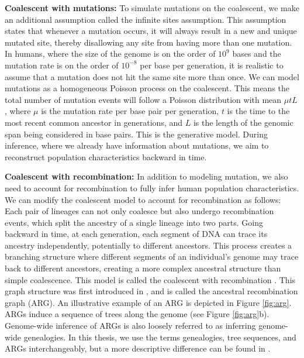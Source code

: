 \textbf{Coalescent with mutations:} To simulate mutations on the coalescent, we make an additional assumption called the infinite sites assumption. This assumption states that whenever a mutation occurs, it will always result in a new and unique mutated site, thereby disallowing any site from having more than one mutation. In humans, where the size of the genome is on the order of \(10^9\) bases and the mutation rate is on the order of \(10^{-8}\) per base per generation, it is realistic to assume that a mutation does not hit the same site more than once. We can model mutations as a homogeneous Poisson process on the coalescent. This means the total number of mutation events will follow a Poisson distribution with mean \(\mu t L\), where \(\mu\) is the mutation rate per base pair per generation, \(t\) is the time to the most recent common ancestor in generations, and \(L\) is the length of the genomic span being considered in base pairs. This is the generative model. During inference, where we already have information about mutations, we aim to reconstruct population characteristics backward in time.

\textbf{Coalescent with recombination:} In addition to modeling mutation, we also need to account for recombination to fully infer human population characteristics. We can modify the coalescent model to account for recombination as follows: Each pair of lineages can not only coalesce but also undergo recombination events, which split the ancestry of a single lineage into two parts. Going backward in time, at each generation, each segment of DNA can trace its ancestry independently, potentially to different ancestors. This process creates a branching structure where different segments of an individual's genome may trace back to different ancestors, creating a more complex ancestral structure than simple coalescence. This model is called the coalescent with recombination \cite{Hudson1983}. This graph structure was first introduced in \cite{Griffiths1997}, and is called the ancestral recombination graph (ARG). An illustrative example of an ARG is depicted in Figure \ref{fig:arg}. ARGs induce a sequence of trees along the genome (see Figure \ref{fig:arg}b). Genome-wide inference of ARGs is also loosely referred to as inferring genome-wide genealogies. In this thesis, we use the terms genealogies, tree sequences, and ARGs interchangeably, but a more descriptive difference can be found in \cite{wong2023general}.

